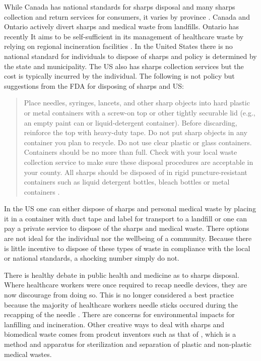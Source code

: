 \documentclass[12pt]{article}
\begin{document}
While Canada has national standards for sharps disposal and many sharps collection and return services for consumers, it varies by province \citep{walkinshaw_medical_2011}. Canada and Ontario actively divert sharps and medical waste from landfills. Ontario has recently  It aims to be self-sufficient in its management of healthcare waste by relying on regional incineration facilities \citep{anyinam_managing_1994}. In the United States there is no national standard for individuals to dispose of sharps and policy is determined by the state and municipality. The US also has sharps collection services but the cost is typically incurred by the individual. The following is not policy but suggestions from the FDA for disposing of sharps and  US: \begin{quote}Place needles, syringes, lancets, and other sharp objects into hard plastic or metal containers with a screw-on top or other tightly securable lid (e.g., an empty paint can or liquid-detergent container).  Before discarding, reinforce the top with heavy-duty tape. Do not put sharp objects in any container you plan to recycle. Do not use clear plastic or glass containers. Containers should be no more than full. Check with your local waste collection service to make sure these disposal procedures are acceptable in your county. All sharps should be disposed of in rigid puncture-resistant containers such as liquid detergent bottles, bleach bottles or metal containers \citep{fda_center_2014}.\end{quote} 
In the US one can either dispose of sharps and personal medical waste by placing it in a container with duct tape and label for transport to a landfill or one can pay a private service to dispose of the sharps and medical waste. There options are not ideal for the individual nor the wellbeing of a community. Because there is little incentive to dispose of these types of waste in compliance with the local or national standards, a shocking number simply do not.

There is healthy debate in public health and medicine as to sharps disposal. Where healthcare workers were once required to recap needle devices, they are now discourage from doing so. This is no longer considered a best practice because the majority of healthcare workers needle sticks occured during the recapping of the needle \citep{ancona_insulin_1994}. There are concerns for environmental impacts for lanfilling and incineration. Other creative ways to deal with sharps and biomedical waste comes from prodcut inventors such as that of \citet{anyinam_managing_1994}, which is a method and apparatus for sterilization and separation of plastic and non-plastic medical wastes. 
\end{document}
